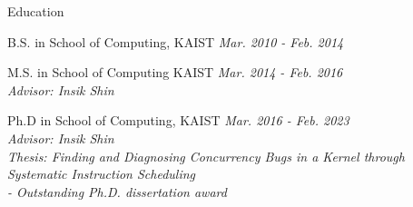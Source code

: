 
\begin{rSection}{Education}

B.S. in School of Computing, KAIST \hfill {\em Mar. 2010 - Feb. 2014}

M.S. in School of Computing KAIST \hfill {\em Mar. 2014 - Feb. 2016} \\
\textit{Advisor: Insik Shin}

Ph.D in School of Computing, KAIST \hfill {\em Mar. 2016 - Feb. 2023} \\
\textit{Advisor: Insik Shin} \\
\textit{Thesis: Finding and Diagnosing Concurrency Bugs in a Kernel through Systematic Instruction Scheduling} \\
\textit{- Outstanding Ph.D. dissertation award}

\end{rSection}
